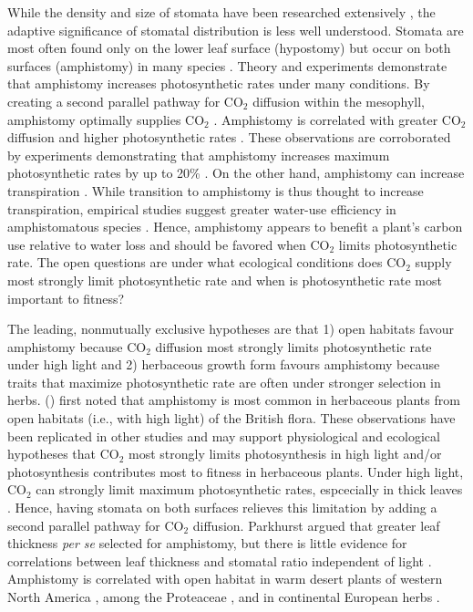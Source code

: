 \documentclass[12pt, oneside]{article}
\begin{document}
While the density and size of stomata have been researched extensively \citep[and references therin]{Sack_Buckley_2016}, the adaptive significance of stomatal distribution is less well understood. Stomata are most often found only on the lower leaf surface (hypostomy) but occur on both surfaces (amphistomy) in many species \citep{Metcalfe_Chalk_1950, Parkhurst_1978, Mott_etal_1982}. Theory and experiments demonstrate that amphistomy increases photosynthetic rates under many conditions. By creating a second parallel pathway for CO$_2$ diffusion within the mesophyll, amphistomy optimally supplies CO$_2$ \citep{Parkhurst_1978, Gutschick_1984b, Jones_1985}. Amphistomy is correlated with greater CO$_2$ diffusion \citep{Beerling_Kelly_1996} and higher photosynthetic rates \citep{Mckown_etal_2014}. These observations are corroborated by experiments demonstrating that amphistomy increases maximum photosynthetic rates by up to 20\% \citep{Parkhurst_Mott_1990}. On the other hand, amphistomy can increase transpiration \citep{Jones_1985, Foster_Smith_1986, Buckley_etal_2015}. While transition to amphistomy is thus thought to increase transpiration, empirical studies suggest greater water-use efficiency in amphistomatous species \citep{Bucher_etal_2017}. Hence, amphistomy appears to benefit a plant's carbon use relative to water loss and should be favored when CO$_2$ limits photosynthetic rate. The open questions are under what ecological conditions does CO$_2$ supply most strongly limit photosynthetic rate \citep{Peat_Fitter_1994b} and when is photosynthetic rate most important to fitness?

The leading, nonmutually exclusive hypotheses are that 1) open habitats favour amphistomy because CO$_2$ diffusion most strongly limits photosynthetic rate under high light and 2) herbaceous growth form favours amphistomy because traits that maximize photosynthetic rate are often under stronger selection in herbs. \citeauthor{Salisbury_1927} (\citeyear{Salisbury_1927}) first noted that amphistomy is most common in herbaceous plants from open habitats (i.e., with high light) of the British flora. These observations have been replicated in other studies \citep{Mott_etal_1982, Peat_Fitter_1994b, Jordan_etal_2014, Muir_2015} and may support physiological and ecological hypotheses that CO$_2$ most strongly limits photosynthesis in high light and/or photosynthesis contributes most to fitness in herbaceous plants. Under high light, CO$_2$ can strongly limit maximum photosynthetic rates, espcecially in thick leaves \citep{Jones_1985}. Hence, having stomata on both surfaces relieves this limitation by adding a second parallel pathway for CO$_2$ diffusion. Parkhurst \citeyear{Parkhurst_1978} argued that greater leaf thickness \textit{per se} selected for amphistomy, but there is little evidence for correlations between leaf thickness and stomatal ratio independent of light \citep{Mott_etal_1982, Gibson_1996, Muir_2015}. Amphistomy is correlated with open habitat in warm desert plants of western North America \citep{Mott_etal_1982, Gibson_1996}, among the Proteaceae \citep{Jordan_etal_2014}, and in continental European herbs \citep{Bucher_etal_2017}.
\end{document}
